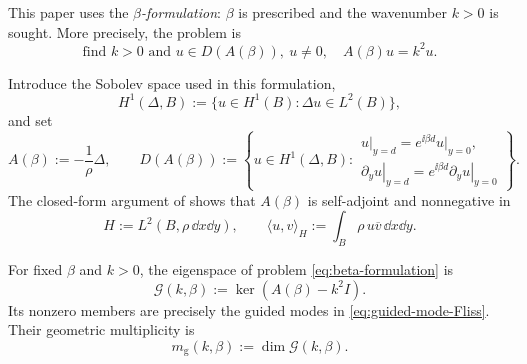 This paper uses the \emph{$\beta$-formulation}: $\beta$ is prescribed and the
wavenumber $k>0$ is sought.  More precisely, the problem is
\begin{equation}
  \boxed{\quad
  \text{find }k>0\text{ and }u\in D(A(\beta)),\ u\neq0,
  \quad A(\beta)u=k^2u.\quad}
  \tag{$E^\beta$}
  \label{eq:beta-formulation}
\end{equation}
\addtocounter{equation}{1}
Introduce the Sobolev space used in this formulation,
\begin{equation}
  H^1(\Delta,B):=\{u\in H^1(B):\Delta u\in L^2(B)\},
  \label{eq:H1-Delta}
\end{equation}
and set
\begin{equation}
  A(\beta):=-\frac{1}{\rho}\Delta,
  \qquad
  D(A(\beta)):=\left\{u\in H^1(\Delta,B):
  \begin{array}{l}
    \left.u\right|_{y=d}
      =e^{\ii\beta d}\left.u\right|_{y=0},\\[-1mm]
    \left.\partial_yu\right|_{y=d}
      =e^{\ii\beta d}\left.\partial_yu\right|_{y=0}
  \end{array}\right\}.
  \label{eq:Abeta}
\end{equation}
The closed-form argument of \cite[Section~3]{Fliss2013} shows that
$A(\beta)$ is self-adjoint and nonnegative in
\begin{equation}
  H:=L^2(B,\rho\,\dd x\dd y),
  \qquad \langle u,v\rangle_H:=\int_B\rho\,u\overline v\,\dd x\dd y.
  \label{eq:weighted-Hilbert-space}
\end{equation}

\begin{definition}
\label{def:guided-space}
For fixed $\beta$ and $k>0$, the eigenspace of problem
\eqref{eq:beta-formulation} is
\begin{equation}
  \mathcal G(k,\beta)
  :=\ker(A(\beta)-k^2I).
  \label{eq:guided-space}
\end{equation}
Its nonzero members are precisely the guided modes in
\eqref{eq:guided-mode-Fliss}.  Their geometric multiplicity is
\begin{equation}
  m_{\mathrm g}(k,\beta):=\dim\mathcal G(k,\beta).
  \label{eq:geometric-multiplicity}
\end{equation}
\end{definition}

